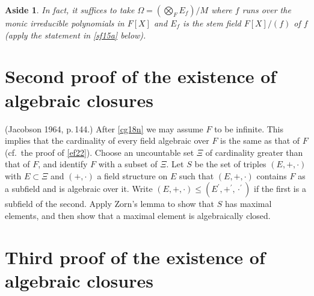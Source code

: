 \documentclass[a4paper,11pt,final,openany]{memoir}
\newtheorem{aside}[X]{Aside}
\theoremstyle{nonumberplain}
\begin{document}
\begin{aside}
In fact, it suffices to take $\Omega=(\bigotimes\nolimits_{F}E_{f})/M$ where
$f$ runs over the monic irreducible polynomials in $F[X]$ and $E_{f}$ is the
stem field $F[X]/(f)$ of $f$ (apply the statement in \ref{sf15a} below).
\end{aside}

\section{Second proof of the existence of algebraic closures}

(Jacobson 1964, p.\,144.) After \ref{cg18n} we may assume $F$ to be infinite.
This implies that the cardinality of every field algebraic over $F$ is the
same as that of $F$ (cf.\ the proof of \ref{ef22}). Choose an uncountable set
$\Xi$ of cardinality greater than that of $F$, and identify $F$ with a subset
of $\Xi$. Let $S$ be the set of triples $(E,+,\cdot)$ with $E\subset\Xi$ and
$(+,\cdot)$ a field structure on $E$ such that $(E,+,\cdot)$ contains $F$ as a
subfield and is algebraic over it. Write $(E,+,\cdot)\leq(E^{\prime}%
,+^{\prime},\cdot^{\prime})$ if the first is a subfield of the second. Apply
Zorn's lemma to show that $S$ has maximal elements, and then show that a
maximal element is algebraically closed.

\section{Third proof of the existence of algebraic closures}
\end{document}
